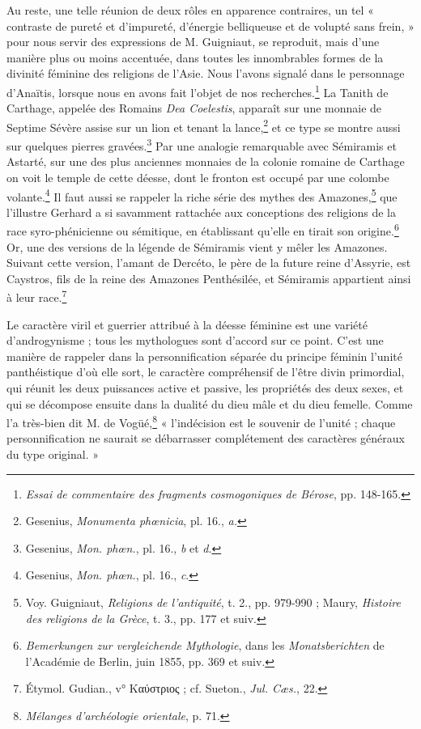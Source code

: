 \documentclass[a4paper, 11pt, oneside]{article}
\begin{document}
Au reste, une telle réunion de deux rôles en apparence contraires, un tel « contraste de pureté et d'impureté, d'énergie belliqueuse et de volupté sans frein, » pour nous servir des expressions de M. Guigniaut, se reproduit, mais d'une manière plus ou moins accentuée, dans toutes les innombrables formes de la divinité féminine des religions de l'Asie. Nous l'avons signalé dans le personnage d'Anaïtis, lorsque nous en avons fait l'objet de nos recherches.\footnote{\emph{Essai de commentaire des fragments cosmogoniques de Bérose}, pp. 148-165.} La Tanith de Carthage, appelée des Romains \emph{Dea Coelestis}, apparaît sur une monnaie de Septime Sévère assise sur un lion et tenant la lance,\footnote{Gesenius, \emph{Monumenta phœnicia}, pl. 16., \emph{a.}} et ce type se montre aussi sur quelques pierres gravées.\footnote{Gesenius, \emph{Mon. phœn.}, pl. 16., \emph{b} et \emph{d}.} Par une analogie remarquable avec Sémiramis et Astarté, sur une des plus anciennes monnaies de la colonie romaine de Carthage on voit le temple de cette déesse, dont le fronton est occupé par une colombe volante.\footnote{Gesenius, \emph{Mon. phœn.}, pl. 16., \emph{c}.} Il faut aussi se rappeler la riche série des mythes des Amazones,\footnote{Voy. Guigniaut, \emph{Religions de l'antiquité}, t. 2., pp. 979-990 ; Maury, \emph{Histoire des religions de la Grèce}, t. 3., pp. 177 et suiv.} que l'illustre Gerhard a si savamment rattachée aux conceptions des religions de la race syro-phénicienne ou sémitique, en établissant qu'elle en tirait son origine.\footnote{\emph{Bemerkungen zur vergleichende Mythologie}, dans les \emph{Monatsberichten} de l'Académie de Berlin, juin 1855, pp. 369 et suiv.} Or, une des versions de la légende de Sémiramis vient y mêler les Amazones. Suivant cette version, l'amant de Dercéto, le père de la future reine d'Assyrie, est Caystros, fils de la reine des Amazones Penthésilée, et Sémiramis appartient ainsi à leur race.\footnote{Étymol. Gudian., v° Καύστριος ; cf. Sueton., \emph{Jul. Cæs.}, 22.}

Le caractère viril et guerrier attribué à la déesse féminine est une variété d'androgynisme ; tous les mythologues sont d'accord sur ce point. C'est une manière de rappeler dans la personnification séparée du principe féminin l'unité panthéistique d'où elle sort, le caractère compréhensif de l'être divin primordial, qui réunit les deux puissances active et passive, les propriétés des deux sexes, et qui se décompose ensuite dans la dualité du dieu mâle et du dieu femelle. Comme l'a très-bien dit M. de Vogüé,\footnote{\emph{Mélanges d'archéologie orientale}, p. 71.} « l'indécision est le souvenir de l'unité ; chaque personnification ne saurait se débarrasser complétement des caractères généraux du type original. »
\end{document}
